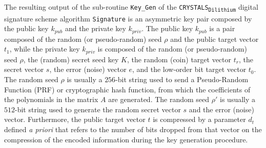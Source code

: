 \documentclass[runningheads]{llncs}
\numberwithin{equation}{section}
\begin{document}
    \noindent The resulting output of the sub-routine \texttt{Key\_Gen} of the \texorpdfstring{\texttt{CRYSTALS}\textsubscript{\texttt{Dilithium}}}\/ digital signature scheme algorithm \texttt{Signature} is an asymmetric key pair composed by the public key ${k}_{pub}$ and the private key ${k}_{priv}$. The public key ${k}_{pub}$ is a pair composed of the random (or pseudo-random) seed $\rho$ and the public target vector ${t}_{1}$, while the private key ${k}_{priv}$ is composed of the random (or pseudo-random) seed $\rho$, the (random) secret seed key $K$, the random (coin) target vector ${t}_{r}$, the secret vector $s$, the error (noise) vector $e$, and the low-order bit target vector ${t}_{0}$. The random seed $\rho$ is usually a $256$-bit string used to send a Pseudo-Random Function (PRF) or cryptographic hash function, from which the coefficients of the polynomials in the matrix $A$ are generated. The random seed $\rho'$ is usually a $512$-bit string used to generate the random secret vector $s$ and the error (noise) vector. Furthermore, the public target vector $t$ is compressed by a parameter ${d}_{t}$ defined \textit{a priori} that refers to the number of bits dropped from that vector on the compression of the encoded information during the key generation procedure.

    \vspace{1ex}
    
\end{document}

